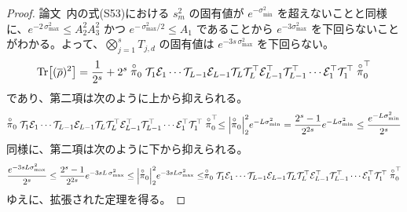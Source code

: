 \begin{proof}\label{prf:concentration-2}
    論文~\cite{li2022concentration}内の式(S53)における $s_m^2$ の固有値が $e^{-\sigma_{\min}^2}$ を超えないことと同様に、$e^{-2\,\sigma_{\max}^2} \leq A_2^2A_3^2$ かつ $e^{-\,\sigma_{\max}^2/2} \leq A_1$ であることから $e^{-3\sigma_{\max}^2}$ を下回らないことがわかる。よって、$\bigotimes_{j=1}^s T_{j,d}$ の固有値は $e^{-3s\,\sigma_{\max}^2}$ を下回らない。
    \begin{align}
        \Tr[(\overline{\rho})^2] = \frac{1}{2^s} + 2^s\stackrel{\circ}{\pi}_0 \mathcal{T}_1 \mathcal{E}_1 \cdots \mathcal{T}_{L-1} \mathcal{E}_{L-1} \mathcal{T}_L \mathcal{T}_L^{\top} \mathcal{E}_{L-1}^{\top} \mathcal{T}_{L-1}^{\top} \cdots \mathcal{E}_1^{\top} \mathcal{T}_1^{\top} \stackrel{\circ}{\pi}_0^{\top}
    \end{align}
    であり、第二項は次のように上から抑えられる。
    \begin{align}
        \stackrel{\circ}{\pi}_0 \mathcal{T}_1 \mathcal{E}_1 \cdots \mathcal{T}_{L-1} \mathcal{E}_{L-1} \mathcal{T}_L \mathcal{T}_L^{\top} \mathcal{E}_{L-1}^{\top} \mathcal{T}_{L-1}^{\top} \cdots \mathcal{E}_1^{\top} \mathcal{T}_1^{\top} \stackrel{\circ}{\pi}_0^{\top}
        \leq \abs{\stackrel{\circ}{\pi}_0}_2^2 e^{-L \sigma_{\min}^2}
        = \frac{2^s-1}{2^{2s}} e^{-L \sigma_{\min}^2}
        \leq \frac{e^{-L \sigma_{\min}^2}}{2^s}
    \end{align}
    同様に、第二項は次のように下から抑えられる。
    \begin{align}
        \frac{e^{-3sL \sigma_{\max}^2}}{2^s} \leq \frac{2^s-1}{2^{2s}} e^{-3sL\,\sigma_{\max}^2} \leq \abs{\stackrel{\circ}{\pi}_0}_2^2 e^{-3sL \sigma_{\max}^2} \leq \stackrel{\circ}{\pi}_0 \mathcal{T}_1 \mathcal{E}_1 \cdots \mathcal{T}_{L-1} \mathcal{E}_{L-1} \mathcal{T}_L \mathcal{T}_L^{\top} \mathcal{E}_{L-1}^{\top} \mathcal{T}_{L-1}^{\top} \cdots \mathcal{E}_1^{\top} \mathcal{T}_1^{\top} \stackrel{\circ}{\pi}_0^{\top}
    \end{align}
    ゆえに、拡張された定理を得る。
\end{proof}